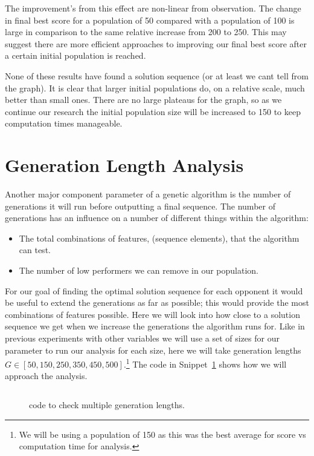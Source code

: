 The improvement's from this effect are non-linear from observation.
The change in final best score for a population of 50 compared with a population of 100 is large in comparison to the same relative increase from 200 to 250.
This may suggest there are more efficient approaches to improving our final best score after a certain initial population is reached.

None of these results have found a solution sequence (or at least we cant tell from the graph).
It is clear that larger initial populations do, on a relative scale, much better than small ones.
There are no large plateaus for the graph, so as we continue our research the initial population size will be increased to 150 to keep computation times manageable.

\section{Generation Length Analysis}\label{sec:generationlengthanalysis}
Another major component parameter of a genetic algorithm is the number of generations it will run before outputting a final sequence.
The number of generations has an influence on a number of different things within the algorithm:

\begin{itemize}
    \item The total combinations of features, (sequence elements), that the algorithm can test.
    \item The number of low performers we can remove in our population.
\end{itemize}

For our goal of finding the optimal solution sequence for each opponent it would be useful to extend the generations as far as possible;
this would provide the most combinations of features possible.
Here we will look into how close to a solution sequence we get when we increase the generations the algorithm runs for.
Like in previous experiments with other variables we will use a set of sizes for our parameter to run our analysis for each size, here we will take generation lengths \(G \in [50,150,250,350,450,500]\).\footnote{We will be using a population of 150 as this was the best average for score vs computation time for analysis.}
The code in Snippet~\ref{code:generationChecker} shows how we will approach the analysis.

\begin{figure}
    \inputminted{python}{code_snippets/generationChecker.py}
    \caption{code to check multiple generation lengths.}\label{code:generationChecker}
\end{figure}

